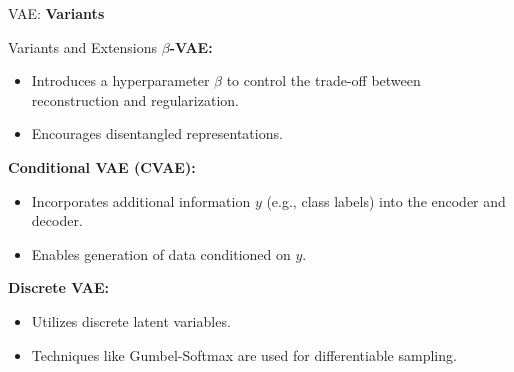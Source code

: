 \begin{frame}{}
	\LARGE VAE: \textbf{Variants}
\end{frame}

\begin{frame}[allowframebreaks]{Variants and Extensions}
\textbf{$\beta$-VAE:}
\begin{itemize}
    \item Introduces a hyperparameter $\beta$ to control the trade-off between reconstruction and regularization.
    \item Encourages disentangled representations.
\end{itemize}

\textbf{Conditional VAE (CVAE):}
\begin{itemize}
    \item Incorporates additional information $y$ (e.g., class labels) into the encoder and decoder.
    \item Enables generation of data conditioned on $y$.
\end{itemize}

\textbf{Discrete VAE:}
\begin{itemize}
    \item Utilizes discrete latent variables.
    \item Techniques like Gumbel-Softmax are used for differentiable sampling.
\end{itemize}
\end{frame}


